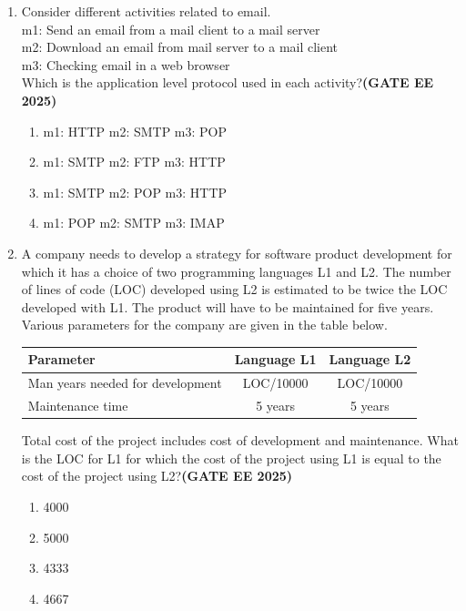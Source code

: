 \documentclass[journal,12pt,onecolumn]{IEEEtran}
\theoremstyle{remark}
\begin{document}
\begin{enumerate}
\item Consider different activities related to email.
\\
m1: Send an email from a mail client to a mail server
\\
m2: Download an email from mail server to a mail client
\\
m3: Checking email in a web browser
\\
Which is the application level protocol used in each activity?\hfill \textbf{(GATE EE 2025)}
\begin{enumerate}
    \item m1: HTTP \quad m2: SMTP \quad m3: POP
    \item m1: SMTP \quad m2: FTP \quad m3: HTTP
    \item m1: SMTP \quad m2: POP \quad m3: HTTP
    \item m1: POP \quad m2: SMTP \quad m3: IMAP
\end{enumerate}

\item A company needs to develop a strategy for software product development for which it has a choice of two programming languages L1 and L2. The number of lines of code (LOC) developed using L2 is estimated to be twice the LOC developed with L1. The product will have to be maintained for five years. Various parameters for the company are given in the table below.

\begin{center}
\begin{tabular}{|l|c|c|}
\hline
\textbf{Parameter} & \textbf{Language L1} & \textbf{Language L2} \\ \hline
Man years needed for development & LOC/10000 & LOC/10000 \\ \hline

Maintenance time & 5 years & 5 years \\ \hline

\end{tabular}
\end{center}

Total cost of the project includes cost of development and maintenance. What is the LOC for L1 for which the cost of the project using L1 is equal to the cost of the project using L2?\hfill \textbf{(GATE EE 2025)}
\begin{enumerate}
    \item 4000
    \item 5000
    \item 4333
    \item 4667
\end{enumerate}


\end{enumerate}
\end{document}

